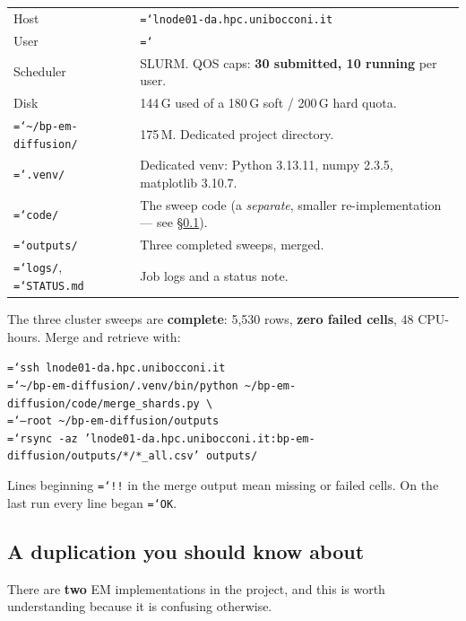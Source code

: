 \documentclass[11pt,a4paper]{article}
\newcommand{\code}[1]{\texttt{\small\hyphenchar\font=`\-\relax #1}}
\begin{document}
\begin{center}
\begin{tabular}{@{}ll@{}}
\toprule
Host & \code{lnode01-da.hpc.unibocconi.it} \\
User & \code{3164542} \\
Scheduler & SLURM. QOS caps: \textbf{30 submitted, 10 running} per user. \\
Disk & 144\,G used of a 180\,G soft / 200\,G hard quota. \\
\midrule
\code{\textasciitilde/bp-em-diffusion/} & 175\,M. Dedicated project directory. \\
\code{\quad .venv/} & Dedicated venv: Python 3.13.11, numpy 2.3.5, matplotlib 3.10.7. \\
\code{\quad code/} & The sweep code (a \emph{separate}, smaller re-implementation --- see
\S\ref{sec:duplication}). \\
\code{\quad outputs/} & Three completed sweeps, merged. \\
\code{\quad logs/}, \code{STATUS.md} & Job logs and a status note. \\
\bottomrule
\end{tabular}
\end{center}

\noindent
The three cluster sweeps are \textbf{complete}: 5{,}530 rows, \textbf{zero failed cells},
48 CPU-hours. Merge and retrieve with:

\begin{keybox}
\code{ssh lnode01-da.hpc.unibocconi.it}\\
\code{\textasciitilde/bp-em-diffusion/.venv/bin/python \textasciitilde/bp-em-diffusion/code/merge\_shards.py \textbackslash}\\
\code{\quad --root \textasciitilde/bp-em-diffusion/outputs}\\[0.4em]
\code{rsync -az 'lnode01-da.hpc.unibocconi.it:bp-em-diffusion/outputs/*/*\_all.csv' outputs/}
\end{keybox}

\noindent
Lines beginning \code{!!} in the merge output mean missing or failed cells. On the last run
every line began \code{OK}.

\subsection{A duplication you should know about}
\label{sec:duplication}

There are \textbf{two} EM implementations in the project, and this is worth understanding
because it is confusing otherwise.
\end{document}
